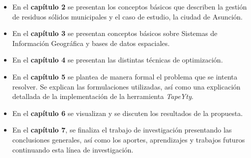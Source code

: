 \begin{itemize}
    \item En el \textbf{capítulo 2} se presentan los conceptos básicos que describen la gestión de residuos sólidos municipales y el caso de estudio, la ciudad de Asunción.
    \item En el \textbf{capítulo 3} se presentan conceptos básicos sobre Sistemas de Información Geográfica y bases de datos espaciales.
    \item En el \textbf{capítulo 4} se presentan las distintas técnicas de optimización.    
    \item En el \textbf{capítulo 5} se plantea de manera formal el problema que se intenta resolver. Se explican las formulaciones utilizadas, así como una explicación detallada de la implementación de la herramienta \textit{TapeYty}. 
    \item En el \textbf{capítulo 6} se visualizan y se discuten los resultados de la propuesta.
    \item En el \textbf{capítulo 7}, se finaliza el trabajo de investigación presentando las conclusiones generales, así como los aportes, aprendizajes y trabajos futuros continuando esta línea de investigación.
\end{itemize}